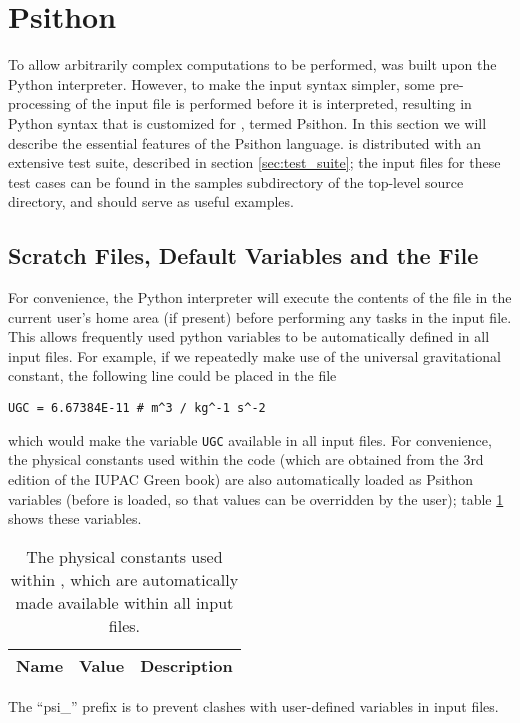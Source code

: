 \section{Psithon} \label{sec:psithon}
\renewcommand{\optionname}[2]{\texttt{\nameref{op-#2-#1}}}

To allow arbitrarily complex computations to be performed, \PSIfour was built
upon the Python interpreter. However, to make the input syntax simpler, some
pre-processing of the input file is performed before it is interpreted,
resulting in Python syntax that is customized for \PSI, termed Psithon.  In
this section we will describe the essential features of the Psithon language.
\PSIfour is distributed with an extensive test suite, described in section
\ref{sec:test_suite}; the input files for these test cases can be found in the
samples subdirectory of the top-level \PSIfour source directory, and should
serve as useful examples.

\subsection{Scratch Files, Default Variables and the \psirc File} \label{sec:psirc}
For convenience, the Python interpreter will execute the contents of the
\psirc file in the current user's home area (if present) before performing any
tasks in the input file.  This allows frequently used python variables to be
automatically defined in all input files.  For example, if we repeatedly make
use of the universal gravitational constant, the following line could be placed
in the \psirc file
\begin{verbatim}
UGC = 6.67384E-11 # m^3 / kg^-1 s^-2
\end{verbatim}
which would make the variable {\tt UGC} available in all \PSIfour input files.
For convenience, the physical constants used within the \PSIfour code (which
are obtained from the 3rd edition of the IUPAC Green
book\cite{Cohen:GreenBook:2008}) are also automatically loaded as Psithon
variables (before \psirc is loaded, so that \psirc values can be overridden by
the user); table \ref{tab:physconst} shows these variables.
\begin{table}[h!]
    \caption{The physical constants used within \PSIfour, which are automatically
             made available within all \PSIfour input files.}
    \label{tab:physconst}
    \setlength{\tabcolsep}{1pt}
    \small
    \begin{tabular}{lll}
        \hline
        \hline
        Name & Value & Description \\
        \hline
        
        \hline
        \hline
    \end{tabular}
\end{table}
The ``psi\_'' prefix is to prevent clashes with user-defined variables in
\PSIfour input files.

